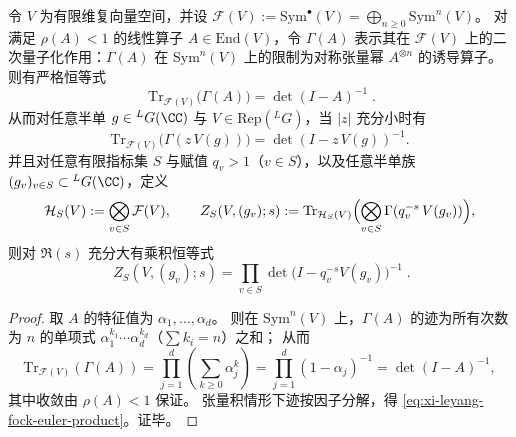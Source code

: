\begin{proposition}\label{prop:xi-leyang-fock-trace-euler-factor}
令 \(V\) 为有限维复向量空间，并设 \(\mathcal F(V):=\mathrm{Sym}^{\bullet}(V)=\bigoplus_{n\ge 0}\mathrm{Sym}^{n}(V)\)。
对满足 \(\rho(A)<1\) 的线性算子 \(A\in\mathrm{End}(V)\)，令 \(\Gamma(A)\) 表示其在 \(\mathcal F(V)\) 上的二次量子化作用：\(\Gamma(A)\) 在 \(\mathrm{Sym}^{n}(V)\) 上的限制为对称张量幂 \(A^{\otimes n}\) 的诱导算子。
则有严格恒等式
\begin{equation}\label{eq:xi-leyang-fock-trace-determinant}
\boxed{\;
\mathrm{Tr}_{\mathcal F(V)}\bigl(\Gamma(A)\bigr)=\det(I-A)^{-1}\; }.
\end{equation}
从而对任意半单 \(g\in{}^{L}G(\CC)\) 与 \(V\in\mathrm{Rep}({}^{L}G)\)，当 \(|z|\) 充分小时有
\[
\mathrm{Tr}_{\mathcal F(V)}\bigl(\Gamma(z\,V(g))\bigr)=\det(I-z\,V(g))^{-1}.
\]
并且对任意有限指标集 \(S\) 与赋值 \(q_v>1\)（\(v\in S\)），以及任意半单族 \((g_v)_{v\in S}\subset {}^{L}G(\CC)\)，定义
\[
\mathcal H_S(V):=\bigotimes_{v\in S}\mathcal F(V),
\qquad
Z_S(V,(g_v);s):=\mathrm{Tr}_{\mathcal H_S(V)}\Bigl(\bigotimes_{v\in S}\Gamma(q_v^{-s}\,V(g_v))\Bigr),
\]
则对 \(\Re(s)\) 充分大有乘积恒等式
\begin{equation}\label{eq:xi-leyang-fock-euler-product}
\boxed{\;
Z_S(V,(g_v);s)=\prod_{v\in S}\det\!\bigl(I-q_v^{-s}V(g_v)\bigr)^{-1}\; }.
\end{equation}
\end{proposition}
\begin{proof}
取 \(A\) 的特征值为 \(\alpha_1,\dots,\alpha_d\)。
则在 \(\mathrm{Sym}^n(V)\) 上，\(\Gamma(A)\) 的迹为所有次数为 \(n\) 的单项式 \(\alpha_1^{k_1}\cdots\alpha_d^{k_d}\)（\(\sum k_i=n\)）之和；
从而
\[
\mathrm{Tr}_{\mathcal F(V)}(\Gamma(A))
=\prod_{j=1}^{d}\left(\sum_{k\ge 0}\alpha_j^{k}\right)
=\prod_{j=1}^{d}(1-\alpha_j)^{-1}
=\det(I-A)^{-1},
\]
其中收敛由 \(\rho(A)<1\) 保证。
张量积情形下迹按因子分解，得 \eqref{eq:xi-leyang-fock-euler-product}。证毕。
\end{proof}

